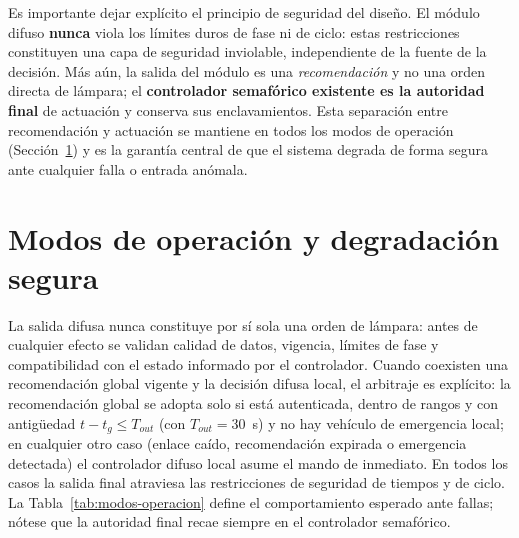 Es importante dejar explícito el principio de seguridad del diseño. El módulo difuso
\textbf{nunca} viola los límites duros de fase ni de ciclo: estas restricciones constituyen una
capa de seguridad inviolable, independiente de la fuente de la decisión. Más aún, la salida del
módulo es una \emph{recomendación} y no una orden directa de lámpara; el \textbf{controlador
semafórico existente es la autoridad final} de actuación y conserva sus enclavamientos. Esta
separación entre recomendación y actuación se mantiene en todos los modos de operación
(Sección~\ref{sec:modos-operacion}) y es la garantía central de que el sistema degrada de forma
segura ante cualquier falla o entrada anómala.

\section{Modos de operación y degradación segura}\label{sec:modos-operacion}

La salida difusa nunca constituye por sí sola una orden de lámpara: antes de cualquier efecto
se validan calidad de datos, vigencia, límites de fase y compatibilidad con el estado informado
por el controlador. Cuando coexisten una recomendación global vigente y la decisión difusa
local, el arbitraje es explícito: la recomendación global se adopta solo si está autenticada,
dentro de rangos y con antigüedad $t-t_{g}\le T_{out}$ (con $T_{out}=30$~s) y no hay vehículo de
emergencia local; en cualquier otro caso (enlace caído, recomendación expirada o emergencia
detectada) el controlador difuso local asume el mando de inmediato. En todos los casos la salida
final atraviesa las restricciones de seguridad de tiempos y de ciclo. La
Tabla~\ref{tab:modos-operacion} define el comportamiento esperado ante fallas; nótese que la
autoridad final recae siempre en el controlador semafórico.

